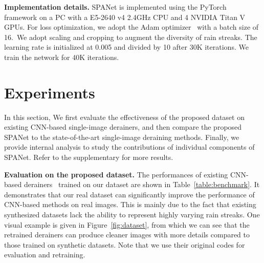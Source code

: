 \documentclass[10pt,twocolumn,letterpaper]{article}
\newcommand{\red}[1]{\textcolor[rgb]{1,0,0}{#1}}
\begin{document}
\begin{table*}[bp]
{\begin{tabular}{@{}ccccc|cccccc@{}}
\end{tabular}
}
\caption{Quantitative results for benchmarking the proposed SPANet and the state-of-the-art derainers on the proposed test set. The original codes of all these derainers are used for evaluation. We have also trained CNN-based state-of-the-art methods~\cite{fu:cvpe:2017:ddn,yang:cvpr:2017:j,zhang:cvpr:2018:did,li:eccv:2018:rsecan} on our dataset, and results are marked in \red{red}. The best performance is marked in {\bf bold}. Note that due to the lack of density labels for the rain images in our dataset, we only fine-tune the pre-trained model of DID-MDN~\cite{zhang:cvpr:2018:did} without the re-training label classification network.}
\label{table:benchmark}

\end{table*}



{\bf Implementation details.} SPANet is implemented using the PyTorch~\cite{pytorch} framework on a PC with a E5-2640 v4 2.4GHz CPU and 4 NVIDIA Titan V GPUs. For loss optimization, we adopt the Adam optimizer~\cite{kingma:iclr:2014:adam} with a batch size of 16.~We adopt scaling and cropping to augment the diversity of rain streaks.
The learning rate is initialized at 0.005 and divided by 10 after 30K iterations. We train the network for 40K iterations.




\section{Experiments}
In this section, We first evaluate the effectiveness of the proposed dataset on existing CNN-based single-image derainers, and then compare the proposed SPANet to the state-of-the-art single-image deraining methods. Finally, we provide internal analysis to study the contributions of individual components of SPANet. Refer to the supplementary for more results.


{\bf Evaluation on the proposed dataset.} The performances of existing CNN-based derainers~\cite{fu:cvpe:2017:ddn,yang:cvpr:2017:j,zhang:cvpr:2018:did,li:eccv:2018:rsecan} trained on our dataset are shown in Table~\ref{table:benchmark}. It demonstrates that our real dataset can significantly improve the performance of CNN-based methods on real images. This is mainly due to the fact that existing synthesized datasets lack the ability to represent highly varying rain streaks. One visual example is given in Figure~\ref{fig:dataset}, from which we can see that the retrained derainers can produce cleaner images with more details compared to those trained on synthetic datasets. Note that we use their original codes for evaluation and retraining.
\end{document}
